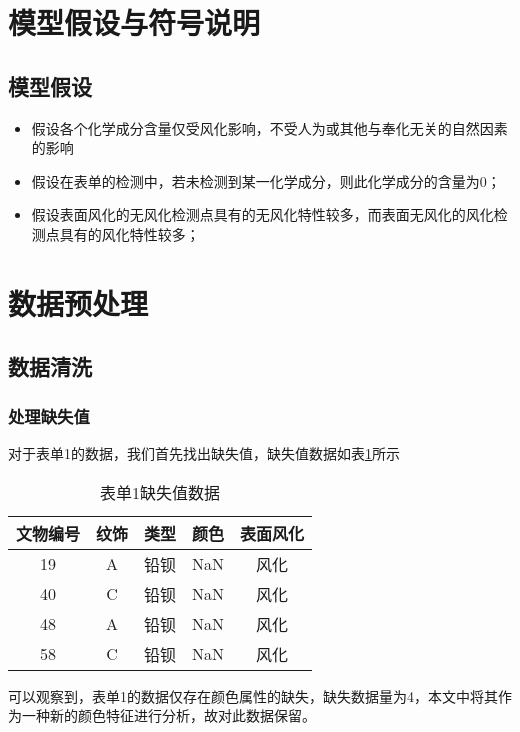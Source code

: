 \documentclass[withoutpreface,bwprint]{cumcmthesis} %
\begin{document}
 
\section{模型假设与符号说明}
\subsection{模型假设}

\begin{itemize}
	\item 假设各个化学成分含量仅受风化影响，不受人为或其他与奉化无关的自然因素的影响
	\item 假设在表单的检测中，若未检测到某一化学成分，则此化学成分的含量为0；
	\item 假设表面风化的无风化检测点具有的无风化特性较多，而表面无风化的风化检测点具有的风化特性较多；
\end{itemize}


\section{数据预处理}
\subsection{数据清洗}
\subsubsection{处理缺失值}
对于表单1的数据，我们首先找出缺失值，缺失值数据如表\ref{queshi}所示

\begin{table}[!h]
	\centering
	\small
	\caption{表单1缺失值数据}
	\label{queshi}
	\begin{tabular}{@{}ccccc@{}}
		\toprule
		\textbf{文物编号} & \textbf{纹饰} & \textbf{类型} & \textbf{颜色} & \textbf{表面风化} \\ \midrule
		19            & A           & 铅钡          & NaN         & 风化            \\
		40            & C           & 铅钡          & NaN         & 风化            \\
		48            & A           & 铅钡          & NaN         & 风化            \\
		58            & C           & 铅钡          & NaN         & 风化            \\ \bottomrule
	\end{tabular}
\end{table}


可以观察到，表单1的数据仅存在颜色属性的缺失，缺失数据量为4，本文中将其作为一种新的颜色特征进行分析，故对此数据保留。
\end{document}
